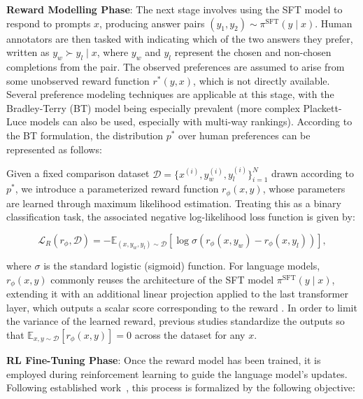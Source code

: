 \textbf{Reward Modelling Phase}: The next stage involves using the SFT model to respond to prompts $x$, producing answer pairs $(y_1, y_2)\sim \pi^\text{SFT}(y \mid x)$. Human annotators are then tasked with indicating which of the two answers they prefer, written as $y_w\succ y_l \mid x$, where $y_w$ and $y_l$ represent the chosen and non-chosen completions from the pair. The observed preferences are assumed to arise from some unobserved reward function $r^*(y, x)$, which is not directly available. Several preference modeling techniques are applicable at this stage, with the Bradley-Terry (BT) \cite{bradley1952rankanalysis} model being especially prevalent (more complex Plackett-Luce models \citep{plackett1975analysis, luce2012individual} can also be used, especially with multi-way rankings). According to the BT formulation, the distribution $p^*$ over human preferences can be represented as follows:

Given a fixed comparison dataset $\mathcal{D} = \bigl\{x^{(i)}, y_w^{(i)}, y_l^{(i)}\bigr\}_{i=1}^N$ drawn according to $p^*$, we introduce a parameterized reward function $r_{\phi}(x, y)$, whose parameters are learned through maximum likelihood estimation. Treating this as a binary classification task, the associated negative log-likelihood loss function is given by:

\begin{equation}\label{eq:reward_model}
    \mathcal{L}_R(r_{\phi}, \mathcal{D}) = -\mathbb{E}_{(x, y_w, y_l)\sim \mathcal{D}}\left[\log \sigma\left(r_{\phi}(x, y_w)- r_{\phi}(x, y_l)\right)\right],
\end{equation}

where $\sigma$ is the standard logistic (sigmoid) function. For language models, $r_{\phi}(x, y)$ commonly reuses the architecture of the SFT model $\pi^\text{SFT}(y \mid x)$, extending it with an additional linear projection applied to the last transformer layer, which outputs a scalar score corresponding to the reward \cite{ziegler2020finetuning}. In order to limit the variance of the learned reward, previous studies standardize the outputs so that $\mathbb{E}_{x,y\sim \mathcal{D}}[r_\phi(x, y)] = 0$ across the dataset for any $x$.

\textbf{RL Fine-Tuning Phase}: Once the reward model has been trained, it is employed during reinforcement learning to guide the language model's updates. Following established work~\citep{jaques2017sequence, jaques2020human}, this process is formalized by the following objective:

